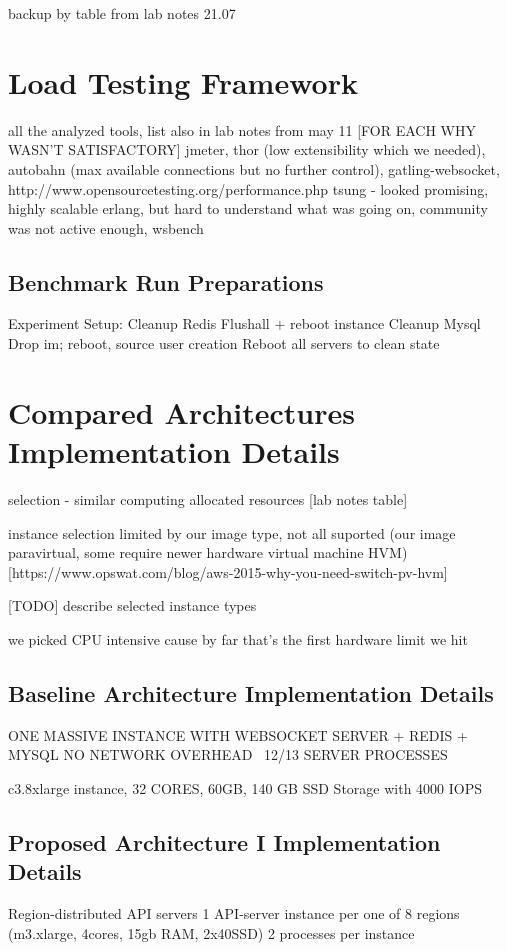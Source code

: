 \documentclass{uvamscse}
\begin{document}
backup by table from lab notes 21.07

\section{Load Testing Framework}\label{Load Testing Framework}
all the analyzed tools, list also in lab notes from may 11 [FOR EACH WHY WASN'T SATISFACTORY]
jmeter, thor (low extensibility which we needed), autobahn (max available connections but no further control),
gatling-websocket, http://www.opensourcetesting.org/performance.php
tsung - looked promising, highly scalable erlang, but hard to understand what was going on, community was not active enough, wsbench


\subsection{Benchmark Run Preparations}

Experiment Setup:
Cleanup Redis
Flushall + reboot instance
Cleanup Mysql
Drop im; reboot, source user creation
Reboot all servers to clean state


\section{Compared Architectures Implementation Details}\label{Compared Architectures Implementation Details}

selection - similar computing allocated resources [lab notes table]

instance selection limited by our image type, not all suported (our image paravirtual, some require newer hardware virtual machine HVM) [https://www.opswat.com/blog/aws-2015-why-you-need-switch-pv-hvm]

[TODO] describe selected instance types

we picked CPU intensive cause by far that's the first hardware limit we hit

\subsection{Baseline Architecture Implementation Details}\label{Baseline Architecture Implementation Details}
ONE MASSIVE INSTANCE WITH WEBSOCKET SERVER + REDIS + MYSQL
NO NETWORK OVERHEAD
~12/13 SERVER PROCESSES

c3.8xlarge instance, 32 CORES, 60GB, 140 GB SSD Storage with 4000 IOPS

\subsection{Proposed Architecture I Implementation Details}\label{Proposed Architecture I Implementation Details}
Region-distributed API servers
1 API-server instance per one of 8 regions (m3.xlarge, 4cores, 15gb RAM, 2x40SSD)
2 processes per instance
\end{document}
